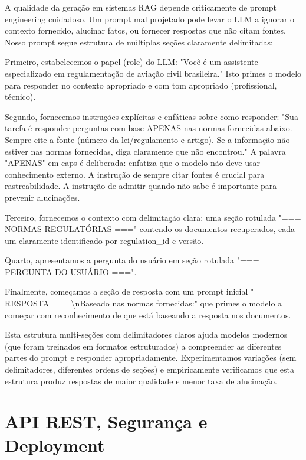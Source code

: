 \documentclass[12pt,a4paper]{article}
\begin{document}
A qualidade da geração em sistemas RAG depende criticamente de prompt engineering cuidadoso. Um prompt mal projetado pode levar o LLM a ignorar o contexto fornecido, alucinar fatos, ou fornecer respostas que não citam fontes. Nosso prompt segue estrutura de múltiplas seções claramente delimitadas:

Primeiro, estabelecemos o papel (role) do LLM: "Você é um assistente especializado em regulamentação de aviação civil brasileira." Isto primes o modelo para responder no contexto apropriado e com tom apropriado (profissional, técnico).

Segundo, fornecemos instruções explícitas e enfáticas sobre como responder: "Sua tarefa é responder perguntas com base APENAS nas normas fornecidas abaixo. Sempre cite a fonte (número da lei/regulamento e artigo). Se a informação não estiver nas normas fornecidas, diga claramente que não encontrou." A palavra "APENAS" em caps é deliberada: enfatiza que o modelo não deve usar conhecimento externo. A instrução de sempre citar fontes é crucial para rastreabilidade. A instrução de admitir quando não sabe é importante para prevenir alucinações.

Terceiro, fornecemos o contexto com delimitação clara: uma seção rotulada "=== NORMAS REGULATÓRIAS ===" contendo os documentos recuperados, cada um claramente identificado por regulation\_id e versão.

Quarto, apresentamos a pergunta do usuário em seção rotulada "=== PERGUNTA DO USUÁRIO ===".

Finalmente, começamos a seção de resposta com um prompt inicial "=== RESPOSTA ===\textbackslash nBaseado nas normas fornecidas:" que primes o modelo a começar com reconhecimento de que está baseando a resposta nos documentos.

Esta estrutura multi-seções com delimitadores claros ajuda modelos modernos (que foram treinados em formatos estruturados) a compreender as diferentes partes do prompt e responder apropriadamente. Experimentamos variações (sem delimitadores, diferentes ordens de seções) e empiricamente verificamos que esta estrutura produz respostas de maior qualidade e menor taxa de alucinação.

\section{API REST, Segurança e Deployment}
\end{document}

